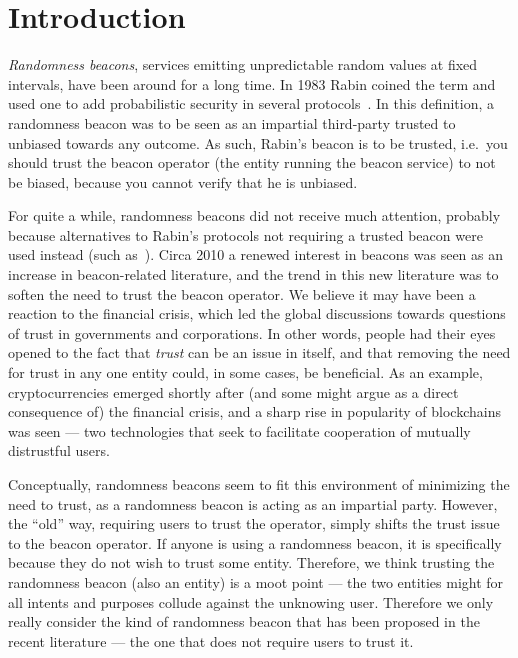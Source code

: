 \section{Introduction}

\emph{Randomness beacons}, services emitting unpredictable random values at fixed intervals, have been around for a long time.
In 1983 Rabin coined the term and used one to add probabilistic security in several protocols~\cite{rabin1983transaction}.
In this definition, a randomness beacon was to be seen as an impartial third-party trusted to unbiased towards any outcome.
As such, Rabin's beacon is to be trusted, i.e.\ you should trust the beacon operator (the entity running the beacon service) to not be biased, because you cannot verify that he is unbiased.

For quite a while, randomness beacons did not receive much attention, probably because alternatives to Rabin's protocols not requiring a trusted beacon were used instead (such as~\cite{BGMR}).
Circa 2010 a renewed interest in beacons was seen as an increase in beacon-related literature, and the trend in this new literature was to soften the need to trust the beacon operator.
We believe it may have been a reaction to the financial crisis, which led the global discussions towards questions of trust in governments and corporations. In other words, people had their eyes opened to the fact that \emph{trust} can be an issue in itself, and that removing the need for trust in any one entity could, in some cases, be beneficial.
As an example, cryptocurrencies emerged shortly after (and some might argue as a direct consequence of) the financial crisis, and a sharp rise in popularity of blockchains was seen --- two technologies that seek to facilitate cooperation of mutually distrustful users.

Conceptually, randomness beacons seem to fit this environment of minimizing the need to trust, as a randomness beacon is acting as an impartial party. However, the \enquote{old} way, requiring users to trust the operator, simply shifts the trust issue to the beacon operator. If anyone is using a randomness beacon, it is specifically because they do not wish to trust some entity. Therefore, we think trusting the randomness beacon (also an entity) is a moot point --- the two entities might for all intents and purposes collude against the unknowing user. Therefore we only really consider the kind of randomness beacon that has been proposed in the recent literature --- the one that does not require users to trust it.

